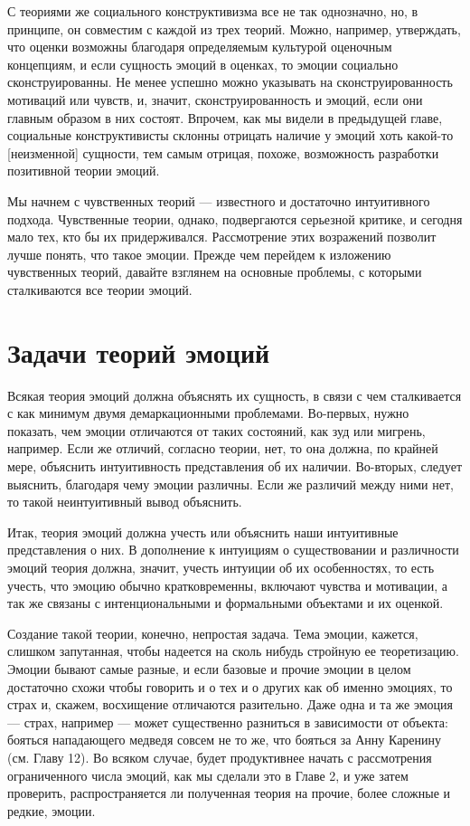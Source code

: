 \documentclass[11pt]{book}
\begin{document}
С теориями же социального конструктивизма все не так однозначно, но, в принципе, он совместим с каждой из трех теорий. Можно, например, утверждать, что оценки возможны благодаря определяемым культурой оценочным концепциям, и если сущность эмоций в оценках, то эмоции социально сконструированны. Не менее успешно можно указывать на сконструированность мотиваций или чувств, и, значит, сконструированность и эмоций, если они главным образом в них состоят. Впрочем, как мы видели в предыдущей главе, социальные конструктивисты склонны отрицать наличие у эмоций хоть какой-то [неизменной] сущности, тем самым отрицая, похоже, возможность разработки позитивной теории эмоций.

Мы начнем с чувственных теорий --- известного и достаточно интуитивного подхода. Чувственные теории, однако, подвергаются серьезной критике, и сегодня мало тех, кто бы их придерживался. Рассмотрение этих возражений позволит лучше понять, что такое эмоции. Прежде чем перейдем к изложению чувственных теорий, давайте взглянем на основные проблемы, с которыми сталкиваются все теории эмоций.

\section{Задачи теорий эмоций}

Всякая теория эмоций должна объяснять их сущность, в связи с чем сталкивается с как минимум двумя демаркационными проблемами. Во-первых, нужно показать, чем эмоции отличаются от таких состояний, как зуд или мигрень, например. Если же отличий, согласно теории, нет, то она должна, по крайней мере, объяснить интуитивность представления об их наличии. Во-вторых, следует выяснить, благодаря чему эмоции различны. Если же различий между ними нет, то такой неинтуитивный вывод объяснить.

Итак, теория эмоций должна учесть или объяснить наши интуитивные представления о них. В дополнение к интуициям о существовании и различности эмоций теория должна, значит, учесть интуиции об их особенностях, то есть учесть, что эмоцию обычно кратковременны, включают чувства и мотивации, а так же связаны с интенциональными и формальными объектами и их оценкой.

Создание такой теории, конечно, непростая задача. Тема эмоции, кажется, слишком запутанная, чтобы надеется на сколь нибудь стройную ее теоретизацию. Эмоции бывают самые разные, и если базовые и прочие эмоции в целом достаточно схожи чтобы говорить и о тех и о других как об именно эмоциях, то страх и, скажем, восхищение отличаются разительно. Даже одна и та же эмоция --- страх, например --- может существенно разниться в зависимости от объекта: бояться нападающего медведя совсем не то же, что бояться за Анну Каренину (см. Главу 12). Во всяком случае, будет продуктивнее начать с рассмотрения ограниченного числа эмоций, как мы сделали это в Главе 2, и уже затем проверить, распространяется ли полученная теория на прочие, более сложные и редкие, эмоции.
\end{document}
